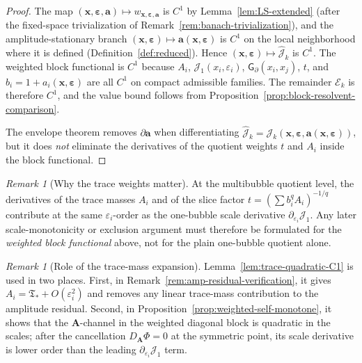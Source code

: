 \documentclass[11pt,reqno,a4paper]{amsart}
\numberwithin{equation}{section}
\theoremstyle{plain}
\theoremstyle{remark}
\newtheorem{remark}[theorem]{Remark}
\theoremstyle{plain}
\begin{document}
\begin{proof}
The map
$(\mathbf x,\boldsymbol\varepsilon,\mathbf a)\mapsto
w_{\mathbf x,\boldsymbol\varepsilon,\mathbf a}$
is $C^1$ by Lemma~\ref{lem:LS-extended} (after the fixed-space trivialization of
Remark~\ref{rem:banach-trivialization}), and the amplitude-stationary branch
$(\mathbf x,\boldsymbol\varepsilon)\mapsto \mathbf a(\mathbf x,\boldsymbol\varepsilon)$
is $C^1$ on the local neighborhood where it is defined
(Definition~\ref{def:reduced}).
Hence $(\mathbf x,\boldsymbol\varepsilon)\mapsto \hat{\mathcal J}_k$ is $C^1$.
The weighted block functional is $C^1$ because
$A_i$, $\mathcal J_1(x_i,\varepsilon_i)$, $\mathsf G_\partial(x_i,x_j)$,
$t$, and $b_i=1+a_i(\mathbf x,\boldsymbol\varepsilon)$ are all $C^1$
on compact admissible families.
The remainder $\mathcal E_k$ is therefore $C^1$, and the value bound follows from
Proposition~\ref{prop:block-resolvent-comparison}.

The envelope theorem removes $\partial\mathbf a$ when differentiating
$\hat{\mathcal J}_k
=\mathcal J_k(\mathbf x,\boldsymbol\varepsilon,\mathbf a(\mathbf x,\boldsymbol\varepsilon))$,
but it does \emph{not} eliminate the derivatives of the quotient weights
$t$ and $A_i$ inside the block functional.
\end{proof}

\begin{remark}[Why the trace weights matter]
\label{rem:block-weight-derivative}
At the multibubble quotient level, the derivatives of the trace masses $A_i$ and of the
slice factor $t=(\sum b_i^qA_i)^{-1/q}$ contribute at the same
$\varepsilon_i$-order as the one-bubble scale derivative
$\partial_{\varepsilon_i}\mathcal J_1$.
Any later scale-monotonicity or exclusion argument must therefore be formulated for the
\emph{weighted block functional} above, not for the plain one-bubble quotient alone.
\end{remark}



\begin{remark}[Role of the trace-mass expansion]
\label{rem:trace-quadratic-C1-role}
Lemma~\ref{lem:trace-quadratic-C1} is used in two places.  First, in
Remark~\ref{rem:amp-residual-verification}, it gives
$A_i=\mathfrak T_\ast+O(\varepsilon_i^2)$ and removes any linear trace-mass contribution to the amplitude
residual.  Second, in Proposition~\ref{prop:weighted-self-monotone}, it shows that the
$\mathbf A$-channel in the weighted diagonal block is quadratic in the scales; after the cancellation
$D_{\mathbf A}\Phi=0$ at the symmetric point, its scale derivative is lower order than the leading
$\partial_{\varepsilon_i}\mathcal J_1$ term.
\end{remark}
\end{document}
